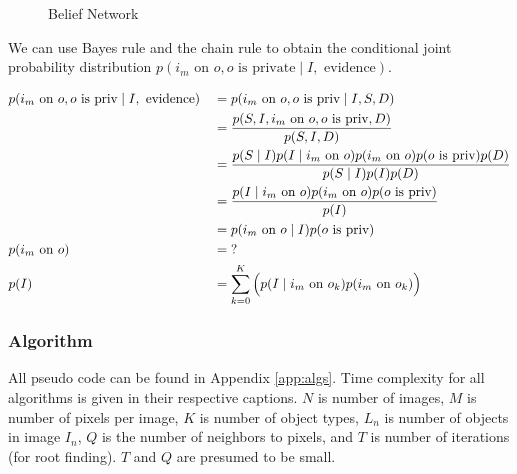 \documentclass[11pt]{article}
\begin{document}
\begin{figure}[ht]
\centering
    \caption{Belief Network}\label{fig:belief}
\end{figure}

We can use Bayes rule and the chain rule to obtain the conditional joint probability distribution $p(i_m \textrm{ on } o, o \textrm{ is private} \mid I, \textrm{ evidence})$.

\begin{align}
    & p(i_m \textrm{ on } o, o \textrm{ is priv} \mid I, \textrm{ evidence})     && = p(i_m \textrm{ on } o, o \textrm{ is priv} \mid I, S, D) \notag\\
    & \quad && = \frac
        {p(S, I, i_m \textrm{ on } o, o \textrm{ is priv}, D)}
        {p(S, I, D)} \notag\\
    & \quad && = \frac
        {p(S \mid I) p(I \mid i_m \textrm{ on } o) p(i_m \textrm{ on } o) p(o \textrm{ is priv}) p(D)}
        {p(S \mid I) p(I) p(D)} \notag\\
    & \quad && = \frac
        {p(I \mid i_m \textrm{ on } o) p(i_m \textrm{ on } o) p(o \textrm{ is priv})}
        {p(I)} \label{eqn:joint}\\
    & \quad && = p(i_m \textrm{ on } o \mid I) p(o \textrm{ is priv}) \label{eqn:indep}\\
    & p(i_m \textrm{ on } o) 
        && = \textrm{?}\\
    & p(I)
        && = \sum_{k = 0}^{K} \Big( p(I \mid i_m \textrm{ on } o_k) p(i_m \textrm{ on } o_k) \Big)%
\end{align}%

\subsubsection{Algorithm}\label{sec:t1alg}

All pseudo code can be found in Appendix \ref{app:algs}.  Time complexity for all algorithms is given in their respective captions.  $N$ is number of images, $M$ is number of pixels per image, $K$ is number of object types, $L_n$ is number of objects in image $I_n$, $Q$ is the number of neighbors to pixels, and $T$ is number of iterations (for root finding). $T$ and $Q$ are presumed to be small.
\end{document}
